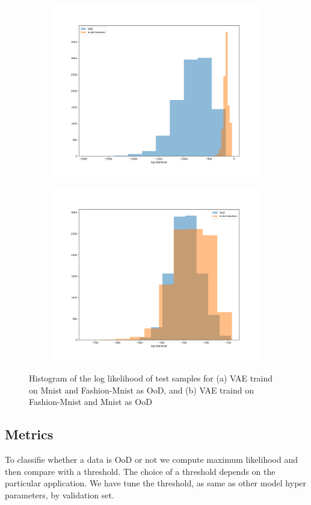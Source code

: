 \documentclass[12pt]{article}
\begin{document}
\begin{figure}
\centering
\begin{subfigure}{.5\textwidth}
  \centering
  \includegraphics[width=.9\linewidth]{../figures/plot_hist.png}
  \caption{}
  \label{fig:sub1}
\end{subfigure}%
\begin{subfigure}{.5\textwidth}
  \centering
  \includegraphics[width=.9\linewidth]{../figures/plot_hist_fmnist.png}
  \caption{}
  \label{fig:sub2}
\end{subfigure}
\caption{Histogram of the log likelihood of test samples for (a) VAE traind on Mnist and Fashion-Mnist as OoD, and (b) VAE traind on Fashion-Mnist and Mnist as OoD}
\label{fig:test}
\end{figure}




\subsection{Metrics}
To classifie whether a data is OoD or not we compute maximum likelihood and then compare with a threshold. The choice of a threshold depends on the particular application. We have tune the threshold, as same as other model hyper parameters, by validation set. 





\mbox{}
\vfill


\end{document}
